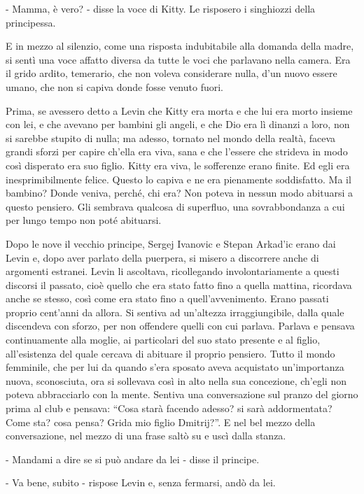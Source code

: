 - Mamma, è vero? - disse la voce di Kitty. Le risposero i singhiozzi della principessa. 

E in mezzo al silenzio, come una risposta indubitabile alla domanda della madre, si sentì una voce affatto diversa da tutte le voci che parlavano nella camera. Era il grido ardito, temerario, che non voleva considerare nulla, d'un nuovo essere umano, che non si capiva donde fosse venuto fuori. 

Prima, se avessero detto a Levin che Kitty era morta e che lui era morto insieme con lei, e che avevano per bambini gli angeli, e che Dio era lì dinanzi a loro, non si sarebbe stupito di nulla; ma adesso, tornato nel mondo della realtà, faceva grandi sforzi per capire ch'ella era viva, sana e che l'essere che strideva in modo così disperato era suo figlio. Kitty era viva, le sofferenze erano finite. Ed egli era inesprimibilmente felice. Questo lo capiva e ne era pienamente soddisfatto. Ma il bambino? Donde veniva, perché, chi era? Non poteva in nessun modo abituarsi a questo pensiero. Gli sembrava qualcosa di superfluo, una sovrabbondanza a cui per lungo tempo non poté abituarsi. 

Dopo le nove il vecchio principe, Sergej Ivanovic e Stepan Arkad'ic erano dai Levin e, dopo aver parlato della puerpera, si misero a discorrere anche di argomenti estranei. Levin li ascoltava, ricollegando involontariamente a questi discorsi il passato, cioè quello che era stato fatto fino a quella mattina, ricordava anche se stesso, così come era stato fino a quell'avvenimento. Erano passati proprio cent'anni da allora. Si sentiva ad un'altezza irraggiungibile, dalla quale discendeva con sforzo, per non offendere quelli con cui parlava. Parlava e pensava continuamente alla moglie, ai particolari del suo stato presente e al figlio, all'esistenza del quale cercava di abituare il proprio pensiero. Tutto il mondo femminile, che per lui da quando s'era sposato aveva acquistato un'importanza nuova, sconosciuta, ora si sollevava così in alto nella sua concezione, ch'egli non poteva abbracciarlo con la mente. Sentiva una conversazione sul pranzo del giorno prima al club e pensava: ``Cosa starà facendo adesso? si sarà addormentata? Come sta? cosa pensa? Grida mio figlio Dmitrij?''. E nel bel mezzo della conversazione, nel mezzo di una frase saltò su e uscì dalla stanza. 

- Mandami a dire se si può andare da lei - disse il principe. 

- Va bene, subito - rispose Levin e, senza fermarsi, andò da lei. 

